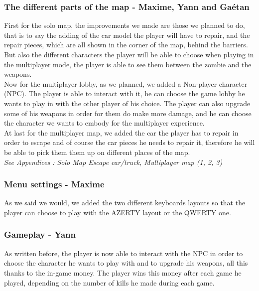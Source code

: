 \documentclass[12pt]{article}
\begin{document}
        \subsubsection{The different parts of the map - Maxime, Yann and Ga\'etan}
        
        First for the solo map, the improvements we made are those we planned to do, that is to say the adding of the car model the player will have to repair, and the repair pieces, which are all shown in the corner of the map, behind the barriers. But also the different characters the player will be able to choose when playing in the multiplayer mode, the player is able to see them between the zombie and the weapons.\\
        Now for the multiplayer lobby, as we planned, we added a \guillemotleft \space Non-player character \guillemotright \space (NPC). The player is able to interact with it, he can choose the game lobby he wants to play in with the other player of his choice. The player can also upgrade some of his weapons in order for them do make more damage, and he can choose the character we wants to embody for the multiplayer experience.\\
        At last for the multiplayer map, we added the car the player has to repair in order to escape and of course the car pieces he needs to repair it, therefore he will be able to pick them them up on different places of the map.\\
        \textit{See Appendices : Solo Map Escape car/truck, Multiplayer map (1, 2, 3)}
        
        \subsubsection{Menu settings - Maxime}
        
        As we said we would, we added the two different keyboards layouts so that the player can choose to play with the AZERTY layout or the QWERTY one.
        
        \subsubsection{Gameplay - Yann}
        
        As written before, the player is now able to interact with the NPC in order to choose the character he wants to play with and to upgrade his weapons, all this thanks to the in-game money. The player wins this money after each game he played, depending on the number of kills he made during each game.\\
        
\end{document}
